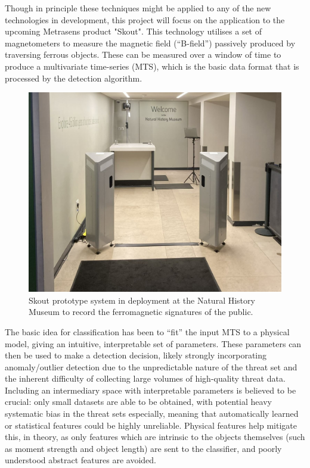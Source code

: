 \documentclass[10pt, a4paper, twocolumn]{article} %
\begin{document}
Though in principle these techniques might be applied to any of the new technologies in development, this project will focus on the application to the upcoming Metrasens product "Skout". This technology utilises a set of magnetometers to measure the magnetic field (“B-field”) passively produced by traversing ferrous objects. These can be measured over a window of time to produce a multivariate time-series (MTS), which is the basic data format that is processed by the detection algorithm.

\begin{figure}
	\includegraphics[width=\linewidth]{Figures/Skout_prototype.jpg} %
	\caption{Skout prototype system in deployment at the Natural History Museum to record the ferromagnetic signatures of the public.}
	\label{Skout_prototype}
\end{figure}

The basic idea for classification has been to “fit” the input MTS to a physical model, giving an intuitive, interpretable set of parameters. These parameters can then be used to make a detection decision, likely strongly incorporating anomaly/outlier detection due to the unpredictable nature of the threat set and the inherent difficulty of collecting large volumes of high-quality threat data. Including an intermediary space with interpretable parameters is believed to be crucial: only small datasets are able to be obtained, with potential heavy systematic bias in the threat sets especially, meaning that automatically learned or statistical features could be highly unreliable. Physical features help mitigate this, in theory, as only features which are intrinsic to the objects themselves (such as moment strength and object length) are sent to the classifier, and poorly understood abstract features are avoided.
\end{document}

